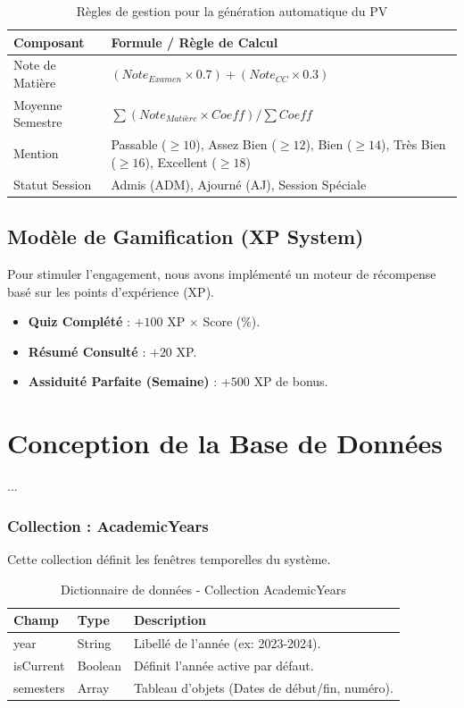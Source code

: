 \begin{table}[H]
\centering
\begin{tabular}{|l|p{10cm}|}
\hline
\textbf{Composant} & \textbf{Formule / Règle de Calcul} \\ \hline
Note de Matière & $(Note_{Examen} \times 0.7) + (Note_{CC} \times 0.3)$ \\ \hline
Moyenne Semestre & $\sum (Note_{Matière} \times Coeff) / \sum Coeff$ \\ \hline
Mention & Passable ($\geq 10$), Assez Bien ($\geq 12$), Bien ($\geq 14$), Très Bien ($\geq 16$), Excellent ($\geq 18$) \\ \hline
Statut Session & Admis (ADM), Ajourné (AJ), Session Spéciale \\ \hline
\end{tabular}
\caption{Règles de gestion pour la génération automatique du PV}
\end{table}

\subsection{Modèle de Gamification (XP System)}
Pour stimuler l'engagement, nous avons implémenté un moteur de récompense basé sur les points d'expérience (XP).
\begin{itemize}
    \item \textbf{Quiz Complété} : $+100$ XP $\times$ Score (\%).
    \item \textbf{Résumé Consulté} : $+20$ XP.
    \item \textbf{Assiduité Parfaite (Semaine)} : $+500$ XP de bonus.
\end{itemize}

\section{Conception de la Base de Données}
...
\subsubsection{Collection : AcademicYears}
Cette collection définit les fenêtres temporelles du système.
\begin{table}[H]
\centering
\begin{tabular}{|l|l|p{8cm}|}
\hline
\textbf{Champ} & \textbf{Type} & \textbf{Description} \\ \hline
year & String & Libellé de l'année (ex: 2023-2024). \\ \hline
isCurrent & Boolean & Définit l'année active par défaut. \\ \hline
semesters & Array & Tableau d'objets (Dates de début/fin, numéro). \\ \hline
\end{tabular}
\caption{Dictionnaire de données - Collection AcademicYears}
\end{table}

